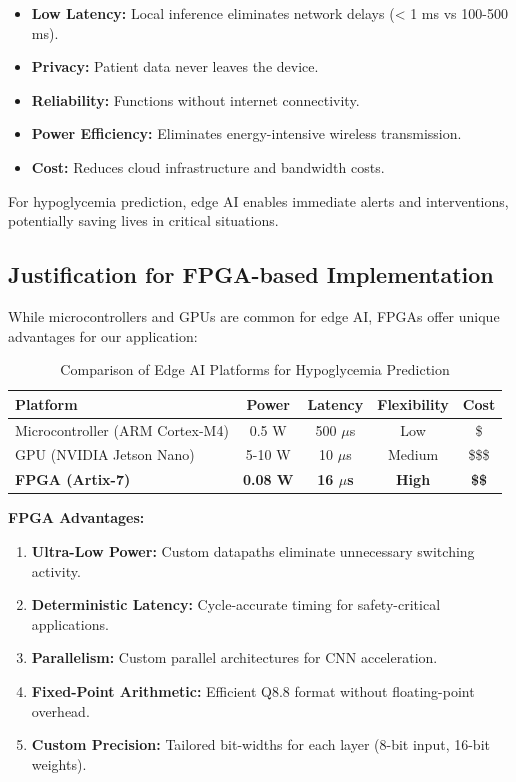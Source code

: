 \documentclass[11pt, a4paper]{article}
\begin{document}
\begin{itemize}
    \item \textbf{Low Latency:} Local inference eliminates network delays (< 1 ms vs 100-500 ms).
    \item \textbf{Privacy:} Patient data never leaves the device.
    \item \textbf{Reliability:} Functions without internet connectivity.
    \item \textbf{Power Efficiency:} Eliminates energy-intensive wireless transmission.
    \item \textbf{Cost:} Reduces cloud infrastructure and bandwidth costs.
\end{itemize}

For hypoglycemia prediction, edge AI enables immediate alerts and interventions, potentially saving lives in critical situations.

\subsection{Justification for FPGA-based Implementation}

While microcontrollers and GPUs are common for edge AI, FPGAs offer unique advantages for our application:

\begin{table}[H]
\centering
\caption{Comparison of Edge AI Platforms for Hypoglycemia Prediction}
\label{tab:platform_comparison}
\begin{tabular}{@{}lcccc@{}}
\toprule
\textbf{Platform} & \textbf{Power} & \textbf{Latency} & \textbf{Flexibility} & \textbf{Cost} \\ \midrule
Microcontroller (ARM Cortex-M4) & 0.5 W & 500 $\mu$s & Low & \$ \\
GPU (NVIDIA Jetson Nano) & 5-10 W & 10 $\mu$s & Medium & \$\$\$ \\
\textbf{FPGA (Artix-7)} & \textbf{0.08 W} & \textbf{16 $\mu$s} & \textbf{High} & \textbf{\$\$} \\ \bottomrule
\end{tabular}
\end{table}

\textbf{FPGA Advantages:}
\begin{enumerate}
    \item \textbf{Ultra-Low Power:} Custom datapaths eliminate unnecessary switching activity.
    \item \textbf{Deterministic Latency:} Cycle-accurate timing for safety-critical applications.
    \item \textbf{Parallelism:} Custom parallel architectures for CNN acceleration.
    \item \textbf{Fixed-Point Arithmetic:} Efficient Q8.8 format without floating-point overhead.
    \item \textbf{Custom Precision:} Tailored bit-widths for each layer (8-bit input, 16-bit weights).
\end{enumerate}
\end{document}
